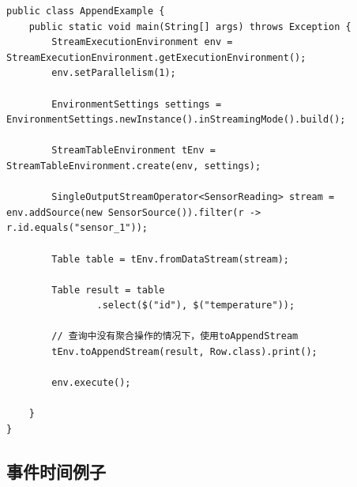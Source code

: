 \documentclass[cn,11pt,chinese]{elegantbook}
\begin{document}
\begin{verbatim}
public class AppendExample {
    public static void main(String[] args) throws Exception {
        StreamExecutionEnvironment env = StreamExecutionEnvironment.getExecutionEnvironment();
        env.setParallelism(1);

        EnvironmentSettings settings = EnvironmentSettings.newInstance().inStreamingMode().build();

        StreamTableEnvironment tEnv = StreamTableEnvironment.create(env, settings);

        SingleOutputStreamOperator<SensorReading> stream = env.addSource(new SensorSource()).filter(r -> r.id.equals("sensor_1"));

        Table table = tEnv.fromDataStream(stream);

        Table result = table
                .select($("id"), $("temperature"));

        // 查询中没有聚合操作的情况下，使用toAppendStream
        tEnv.toAppendStream(result, Row.class).print();

        env.execute();

    }
}
\end{verbatim}

\subsection{事件时间例子}
\end{document}
